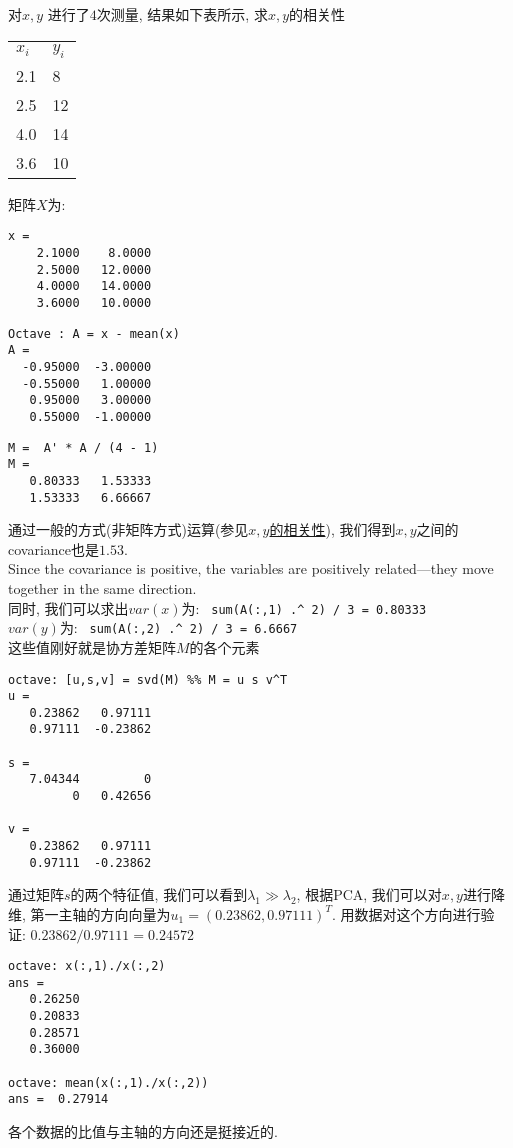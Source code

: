 \documentclass{article}
\begin{document}
\begin{example}
对$x,y$ 进行了$4$次测量, 结果如下表所示, 求$x,y$的相关性
\begin{table}[h]
\begin{tabular}{ll}
\hline
$x_i$ & $y_i$ \\
2.1   & 8     \\
2.5   & 12    \\ 
4.0   & 14    \\
3.6   & 10 \\
\end{tabular}
\end{table}

矩阵$X$为:
\begin{verbatim}
x =
    2.1000    8.0000
    2.5000   12.0000
    4.0000   14.0000
    3.6000   10.0000
\end{verbatim}
\begin{verbatim}
Octave : A = x - mean(x)
A =
  -0.95000  -3.00000
  -0.55000   1.00000
   0.95000   3.00000
   0.55000  -1.00000
\end{verbatim}
\begin{verbatim}
M =  A' * A / (4 - 1)
M =
   0.80333   1.53333
   1.53333   6.66667
\end{verbatim}
通过一般的方式(非矩阵方式)运算(参见\href{https://www0.gsb.columbia.edu/premba/analytical/s7/s7\_5.cfm}{$x,y$的相关性}), 我们得到$x,y$之间的covariance也是$1.53$.\\
Since the covariance is positive, the variables are positively related—they move together in the same direction.\\
同时, 我们可以求出$var(x)$为: \verb& sum(A(:,1) .^ 2) / 3 = 0.80333 & \\
$var(y)$为: \verb& sum(A(:,2) .^ 2) / 3 = 6.6667 & \\
这些值刚好就是协方差矩阵$M$的各个元素
\begin{verbatim}
octave: [u,s,v] = svd(M) %% M = u s v^T
u =
   0.23862   0.97111
   0.97111  -0.23862

s =
   7.04344         0
         0   0.42656

v =
   0.23862   0.97111
   0.97111  -0.23862
\end{verbatim}
通过矩阵$s$的两个特征值, 我们可以看到$\lambda_1 \gg \lambda_2$, 根据PCA, 我们可以对$x,y$进行降维, 第一主轴的方向向量为$u_1 = (0.23862, 0.97111)^T$. 用数据对这个方向进行验证:
$0.23862 / 0.97111 = 0.24572$

\begin{verbatim}
octave: x(:,1)./x(:,2)
ans =
   0.26250
   0.20833
   0.28571
   0.36000

octave: mean(x(:,1)./x(:,2))
ans =  0.27914
\end{verbatim}
各个数据的比值与主轴的方向还是挺接近的.
\end{example}
\end{document}
